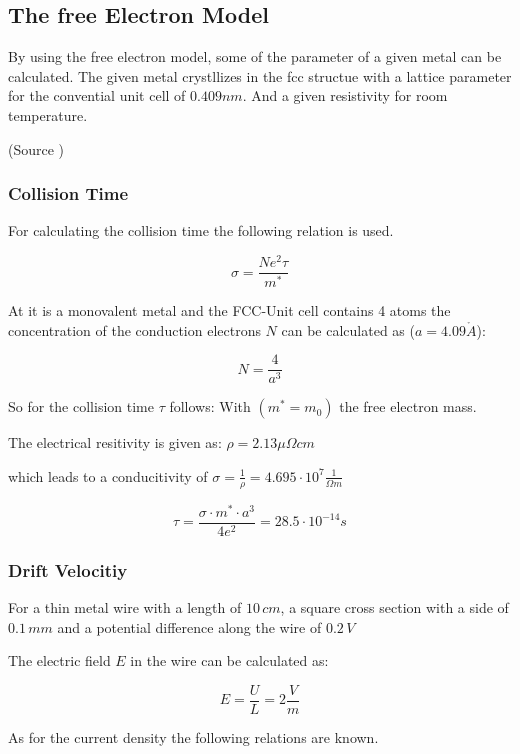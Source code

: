 \subsection{The free Electron Model} \label{chap1}

By using the free electron model, some of the parameter
of a given metal can be calculated. The given metal
crystllizes in the fcc structue with a lattice parameter 
for the convential unit cell of $0.409nm$. And a given 
resistivity for room temperature.

(Source \cite[Elementary Solid State Physics Chapter 4]{elementary_SSP})

\subsubsection*{Collision Time}

For calculating the collision time the following relation
is used.

\begin{equation}
    \sigma = \frac{N e^2 \tau}{m^*}
\end{equation}


At it is a monovalent metal and the FCC-Unit cell contains 
4 atoms the concentration of the conduction electrons $N$ can be
calculated as ($a = 4.09 \mathring{A}$):

$$N =\frac{4}{a^3}$$

So for the collision time $\tau$ follows:
With $(m^* = m_0)$ the free electron mass.

The electrical resitivity is given as:
$\rho = 2.13 \mu \Omega cm$

which leads to a conducitivity of
$\sigma = \frac{1}{\rho} = 4.695\cdot 10^7 \frac{1}{\Omega m}$


$$\tau =\frac{\sigma \cdot m^* \cdot a^3}{4e^2} = 28.5 \cdot 10^{-14}s$$

\subsubsection*{Drift Velocitiy}

For a thin metal wire with a length of $10 \, cm$, a square cross section with 
a side of $0.1 \, mm$ and a potential difference along the wire of $0.2 \, V$

The electric field $E$ in the wire can be calculated as: 

$$E = \frac{U}{L} = 2 \frac{V}{m}$$

As for the current density the following relations are known.

